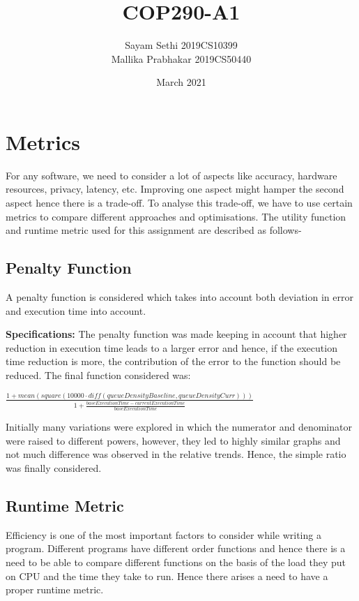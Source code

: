 \documentclass{article}
\title{COP290-A1}
\author{Sayam Sethi 2019CS10399 \\ Mallika Prabhakar 2019CS50440 }
\date{March 2021}
\newcommand\ddfrac[2]{{\displaystyle\frac{\displaystyle #1}{\displaystyle #2}}}
\begin{document}
\maketitle

\section{Metrics}
For any software, we need to consider a lot of aspects like accuracy, hardware resources, privacy, latency, etc. Improving one aspect might hamper the second aspect hence there is a trade-off. To analyse this trade-off, we have to use certain metrics to compare different approaches and optimisations. The utility function and runtime metric used for this assignment are described as follows-

\subsection{Penalty Function}
A penalty function is considered which takes into account both deviation in error and execution time into account.

\textbf{Specifications:} The penalty function was made keeping in account that higher reduction in execution time leads to a larger error and hence, if the execution time reduction is more, the contribution of the error to the function should be reduced. The final function considered was:
\begin{center}
    $\ddfrac{1 + \mathit{mean}(\mathit{square}(10000\cdot\mathit{diff}(\mathit{queueDensityBaseline}, \mathit{queueDensityCurr})))}{1 + \frac{\mathit{baseExecutionTime} - \mathit{currentExecutionTime}}{\mathit{baseExecutionTime}}}$
\end{center}
Initially many variations were explored in which the numerator and denominator were raised to different powers, however, they led to highly similar graphs and not much difference was observed in the relative trends. Hence, the simple ratio was finally considered.

\subsection{Runtime Metric}
Efficiency is one of the most important factors to consider while writing a program. Different programs have different order functions and hence there is a need to be able to compare different functions on the basis of the load they put on CPU and the time they take to run. Hence there arises a need to have a proper runtime metric.
\end{document}
